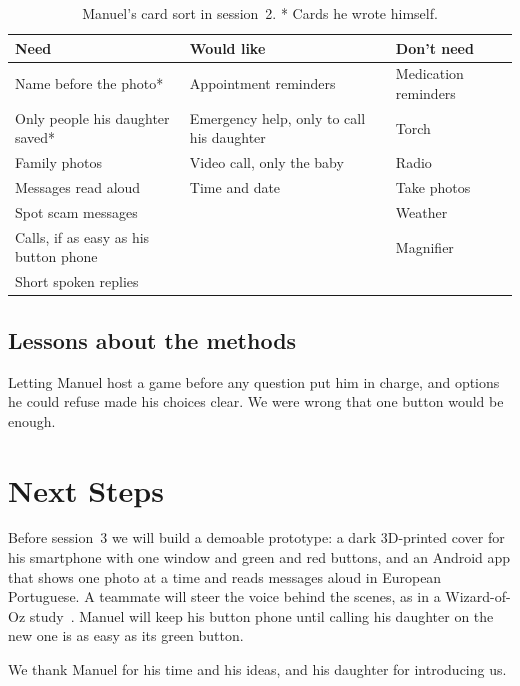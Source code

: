 \documentclass[acmtog,nonacm]{acmart}
\begin{document}
\begin{table}[t]
  \caption{Manuel's card sort in session~2. * Cards he wrote himself.}
  \label{tab:cards}
  \small
  \begin{tabular}{@{}L{0.34\columnwidth}L{0.31\columnwidth}L{0.23\columnwidth}@{}}
    \toprule
    Need & Would like & Don't need \\
    \midrule
    Name before the photo* & Appointment reminders & Medication reminders \\
    Only people his daughter saved* & Emergency help, only to call his daughter & Torch \\
    Family photos & Video call, only the baby & Radio \\
    Messages read aloud & Time and date & Take photos \\
    Spot scam messages & & Weather \\
    Calls, if as easy as his button phone & & Magnifier \\
    Short spoken replies & & \\
    \bottomrule
  \end{tabular}
\end{table}

\subsection{Lessons about the methods}
Letting Manuel host a game before any question put him in charge, and options he could refuse made his choices clear. We were wrong that one button would be enough.

\section{Next Steps}\label{sec:next}
Before session~3 we will build a demoable prototype: a dark 3D-printed cover for his smartphone with one window and green and red buttons, and an Android app that shows one photo at a time and reads messages aloud in European Portuguese. A teammate will steer the voice behind the scenes, as in a Wizard-of-Oz study~\cite{dahlback1993wizard}. Manuel will keep his button phone until calling his daughter on the new one is as easy as its green button.

\begin{acks}
We thank Manuel for his time and his ideas, and his daughter for introducing us.
\end{acks}



\end{document}

